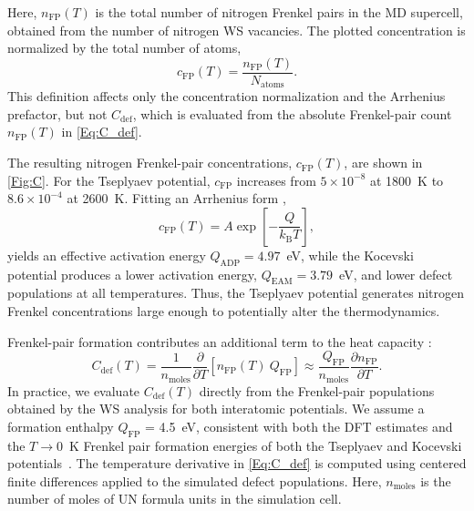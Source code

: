 \documentclass[preprint,12pt,sort&compress]{elsarticle}
\newcommand{\?}{\stackrel{?}{=}}
\begin{document}
Here, $n_{\mathrm{FP}}(T)$ is the total number of nitrogen Frenkel pairs in the MD supercell, obtained from the number of nitrogen WS vacancies. The plotted concentration is normalized by the total number of atoms,
\begin{equation}
c_{\mathrm{FP}}(T)=\frac{n_{\mathrm{FP}}(T)}{N_{\mathrm{atoms}}}.
\end{equation}
This definition affects only the concentration normalization and the Arrhenius prefactor, but not $C_{\mathrm{def}}$, which is evaluated from the absolute Frenkel-pair count $n_{\mathrm{FP}}(T)$ in \cref{Eq:C_def}.

The resulting nitrogen Frenkel-pair concentrations, $c_{\mathrm{FP}}(T)$, are shown in \cref{Fig:C}. For the Tseplyaev potential, $c_{\mathrm{FP}}$ increases from $5\times10^{-8}$ at 1800~K to $8.6\times10^{-4}$ at 2600~K. Fitting an Arrhenius form \cite{Olander2017},
\begin{equation}
c_{\mathrm{FP}}(T) = A \exp\!\left[-\frac{Q}{k_{\mathrm{B}}T}\right],
\end{equation}
yields an effective activation energy $Q_{\mathrm{ADP}} = 4.97$~eV, while the Kocevski potential produces a lower activation energy, $Q_{\mathrm{EAM}} = 3.79$~eV, and lower defect populations at all temperatures. Thus, the Tseplyaev potential generates nitrogen Frenkel concentrations large enough to potentially alter the thermodynamics.


Frenkel-pair formation contributes an additional term to the heat capacity \cite{Szwarc1969,Pavlov2017}:
\begin{equation}
C_{\mathrm{def}}(T) = \frac{1}{n_{\mathrm{moles}}} \frac{\partial}{\partial T} \left[n_{\mathrm{FP}}(T) \ Q_\text{FP} \right]
\approx \frac{Q_\text{FP}}{n_{\mathrm{moles}}} \frac{\partial n_{\mathrm{FP}}}{\partial T}.
\label{Eq:C_def}
\end{equation}
In practice, we evaluate $C_{\mathrm{def}}(T)$ directly from the Frenkel-pair populations obtained by the WS analysis for both interatomic potentials. We assume a formation enthalpy $Q_\text{FP}$ = 4.5~eV, consistent with both the DFT estimates \cite{Yang2021,Kocevski2022I} and the $T \rightarrow 0$~K Frenkel pair formation energies of both the Tseplyaev and Kocevski potentials~\cite{AbdulHameed2024}. The temperature derivative in \cref{Eq:C_def} is computed using centered finite differences applied to the simulated defect populations. Here, $n_{\mathrm{moles}}$ is the number of moles of UN formula units in the simulation cell.
\end{document}
